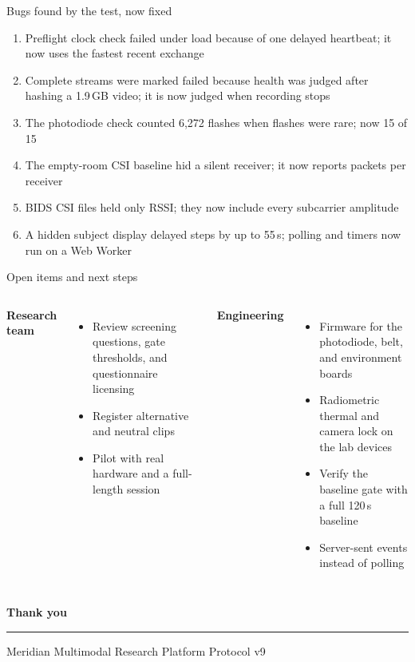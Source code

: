\documentclass[aspectratio=169,11pt]{beamer}
\begin{document}
\begin{frame}{Bugs found by the test, now fixed}
  \small
  \begin{enumerate}
    \item Preflight clock check failed under load because of one delayed heartbeat; it now uses the fastest recent exchange
    \item Complete streams were marked failed because health was judged after hashing a 1.9\,GB video; it is now judged when recording stops
    \item The photodiode check counted 6,272 flashes when flashes were rare; now 15 of 15
    \item The empty-room CSI baseline hid a silent receiver; it now reports packets per receiver
    \item BIDS CSI files held only RSSI; they now include every subcarrier amplitude
    \item A hidden subject display delayed steps by up to 55\,s; polling and timers now run on a Web Worker
  \end{enumerate}
\end{frame}

\begin{frame}{Open items and next steps}
  \begin{columns}[T]
    \textbf{Research team}
    \begin{itemize}\small
      \item Review screening questions, gate thresholds, and questionnaire licensing
      \item Register alternative and neutral clips
      \item Pilot with real hardware and a full-length session
    \end{itemize}
    \textbf{Engineering}
    \begin{itemize}\small
      \item Firmware for the photodiode, belt, and environment boards
      \item Radiometric thermal and camera lock on the lab devices
      \item Verify the baseline gate with a full 120\,s baseline
      \item Server-sent events instead of polling
    \end{itemize}
  \end{columns}
\end{frame}

\begin{frame}[plain]
  \vfill
  \centering
  {\color{ink}\Huge\bfseries Thank you}\par\vspace{0.5em}
  {\color{clay}\rule{3em}{2pt}}\par\vspace{0.8em}
  {\small\color{slate}Meridian Multimodal Research Platform \quad\textbar\quad Protocol v9}
  \vfill
\end{frame}
\end{document}
